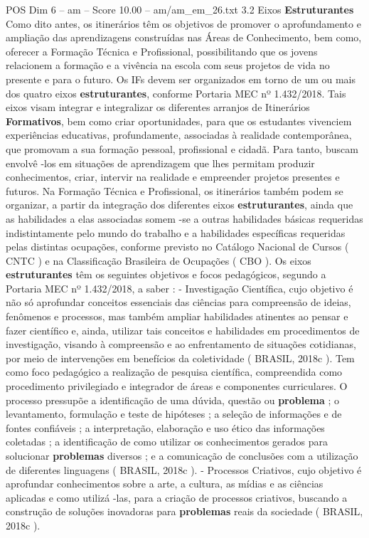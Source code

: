 \begin{textsample}{POS Dim 6 – am – Score 10.00 – am/am\_em\_26.txt}  \label{ex:f6_pos_262}
3.2 Eixos \textbf{Estruturantes} Como dito antes, os itinerários têm os objetivos de promover o aprofundamento e ampliação das aprendizagens construídas nas Áreas de Conhecimento, bem como, oferecer a Formação Técnica e Profissional, possibilitando que os jovens relacionem a formação e a vivência na escola com seus projetos de vida no presente e para o futuro.
Os IFs devem ser organizados em torno de um ou mais dos quatro eixos \textbf{estruturantes}, conforme Portaria MEC nº 1.432/2018.
Tais eixos visam integrar e integralizar os diferentes arranjos de Itinerários \textbf{Formativos}, bem como criar oportunidades, para que os estudantes vivenciem experiências educativas, profundamente, associadas à realidade contemporânea, que promovam a sua formação pessoal, profissional e cidadã.
Para tanto, buscam envolvê -los em situações de aprendizagem que lhes permitam produzir conhecimentos, criar, intervir na realidade e empreender projetos presentes e futuros.
Na Formação Técnica e Profissional, os itinerários também podem se organizar, a partir da integração dos diferentes eixos \textbf{estruturantes}, ainda que as habilidades a elas associadas somem -se a outras habilidades básicas requeridas indistintamente pelo mundo do trabalho e a habilidades específicas requeridas pelas distintas ocupações, conforme previsto no Catálogo Nacional de Cursos ( CNTC ) e na Classificação Brasileira de Ocupações ( CBO ).
Os eixos \textbf{estruturantes} têm os seguintes objetivos e focos pedagógicos, segundo a Portaria MEC nº 1.432/2018, a saber : - Investigação Científica, cujo objetivo é não só aprofundar conceitos essenciais das ciências para compreensão de ideias, fenômenos e processos, mas também ampliar habilidades atinentes ao pensar e fazer científico e, ainda, utilizar tais conceitos e habilidades em procedimentos de investigação, visando à compreensão e ao enfrentamento de situações cotidianas, por meio de intervenções em benefícios da coletividade ( BRASIL, 2018c ).
Tem como foco pedagógico a realização de pesquisa científica, compreendida como procedimento privilegiado e integrador de áreas e componentes curriculares.
O processo pressupõe a identificação de uma dúvida, questão ou \textbf{problema} ; o levantamento, formulação e teste de hipóteses ; a seleção de informações e de fontes confiáveis ; a interpretação, elaboração e uso ético das informações coletadas ; a identificação de como utilizar os conhecimentos gerados para solucionar \textbf{problemas} diversos ; e a comunicação de conclusões com a utilização de diferentes linguagens ( BRASIL, 2018c ). - Processos Criativos, cujo objetivo é aprofundar conhecimentos sobre a arte, a cultura, as mídias e as ciências aplicadas e como utilizá -las, para a criação de processos criativos, buscando a construção de soluções inovadoras para \textbf{problemas} reais da sociedade ( BRASIL, 2018c ).

\end{textsample}

